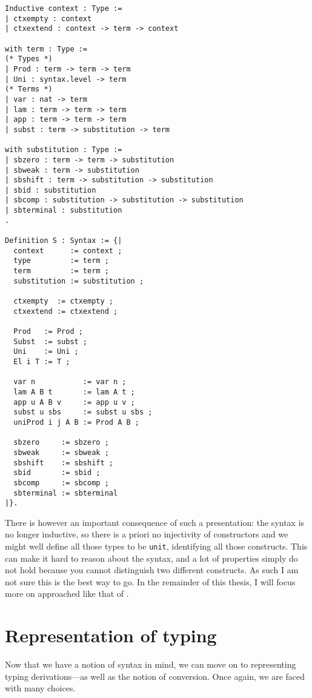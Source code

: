 \begin{verbatim}
Inductive context : Type :=
| ctxempty : context
| ctxextend : context -> term -> context

with term : Type :=
(* Types *)
| Prod : term -> term -> term
| Uni : syntax.level -> term
(* Terms *)
| var : nat -> term
| lam : term -> term -> term
| app : term -> term -> term
| subst : term -> substitution -> term

with substitution : Type :=
| sbzero : term -> term -> substitution
| sbweak : term -> substitution
| sbshift : term -> substitution -> substitution
| sbid : substitution
| sbcomp : substitution -> substitution -> substitution
| sbterminal : substitution
.

Definition S : Syntax := {|
  context      := context ;
  type         := term ;
  term         := term ;
  substitution := substitution ;

  ctxempty  := ctxempty ;
  ctxextend := ctxextend ;

  Prod   := Prod ;
  Subst  := subst ;
  Uni    := Uni ;
  El i T := T ;

  var n           := var n ;
  lam A B t       := lam A t ;
  app u A B v     := app u v ;
  subst u sbs     := subst u sbs ;
  uniProd i j A B := Prod A B ;

  sbzero     := sbzero ;
  sbweak     := sbweak ;
  sbshift    := sbshift ;
  sbid       := sbid ;
  sbcomp     := sbcomp ;
  sbterminal := sbterminal
|}.

\end{verbatim}

There is however an important consequence of such a presentation: the syntax is
no longer inductive, so there is a priori no injectivity of constructors and
we might well define all those types to be \texttt{unit}, identifying
all those constructs.
This can make it hard to reason about the syntax, and a lot of properties simply
do not hold because you cannot distinguish two different constructs.
As such I am not sure this is the best way to go.
In the remainder of this thesis, I will focus more on approached like that of
\MetaCoq.

\section{Representation of typing}

Now that we have a notion of syntax in mind, we can move on to representing
typing derivations---as well as the notion of conversion.
Once again, we are faced with many choices.

